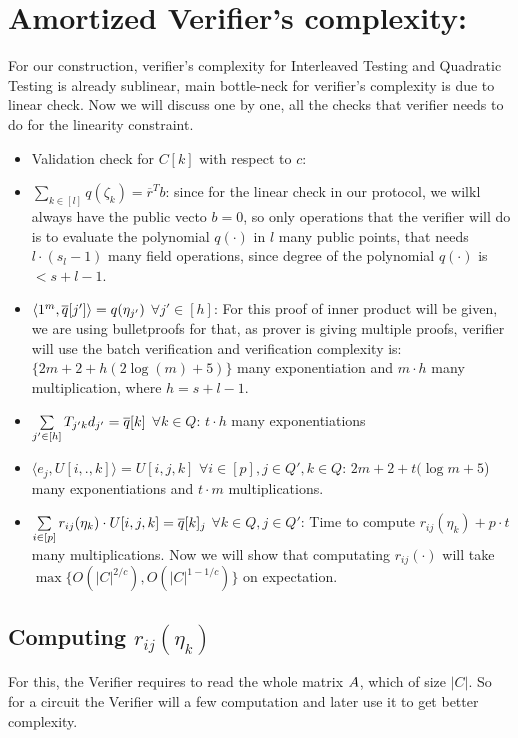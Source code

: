 \section{Amortized Verifier's complexity:}

For our construction, verifier's complexity for Interleaved Testing and Quadratic Testing is already sublinear, main bottle-neck for verifier's complexity is due to linear check.
Now we will discuss one by one, all the checks that verifier needs to do for the linearity constraint.
\begin{itemize}
	\item Validation check for $C[k]$ with respect to $c$: 
	\item $\sum\limits_{k\in[l]} q(\zeta_k) = \overline{r}^T b$: since for the linear check in our protocol, we wilkl always have the public vecto $b=0$, so only operations that the verifier will do is to evaluate the polynomial $q(\cdot)$ in $l$ many public points, that needs $l\cdot (s_l-1)$ many field operations, since degree of the polynomial $q(\cdot)$ is $<s+l-1$.
	\item $\langle 1^m , \overline{q}[j'] \rangle = q(\eta_{j'})$ $\forall j'\in [h]$: For this proof of inner product will be given, we are using bulletproofs for that, as prover is giving multiple proofs, verifier will use the batch verification and verification complexity is: $\{2m+ 2+ h(2\log(m)+5)\}$ many exponentiation and $m\cdot h$ many multiplication, where $h=s+l-1$.
	\item $\sum\limits_{j'\in [h]} T_{j'k}d_{j'}=\overline{q}[k]$ $\forall k\in Q$: $t\cdot h$ many exponentiations
	\item $\langle e_j,U[i,.,k] \rangle=U[i,j,k]$ $\forall i\in [p], j\in Q', k\in Q$: $2m+ 2+ t(\log m +5$) many exponentiations and $t\cdot m$ multiplications.
	\item $\sum\limits_{i\in[p]} r_{ij}(\eta_k)\cdot U[i,j,k] = \overline{q}[k]_j $ $\forall k\in Q, j\in Q'$: Time to compute $r_{ij}(\eta_k) + p\cdot t$ many multiplications. Now we will show that computating $r_{ij}(\cdot)$ will take $\max\{O(|C|^{2/c}), O(|C|^{1-1/c})\}$ on expectation.
\end{itemize}
\subsection{Computing $r_{ij}(\eta_k)$}
For this, the Verifier requires to read the whole matrix $A$, which of size $|C|$. So for a circuit the Verifier will a few computation and later use it to get better complexity.

